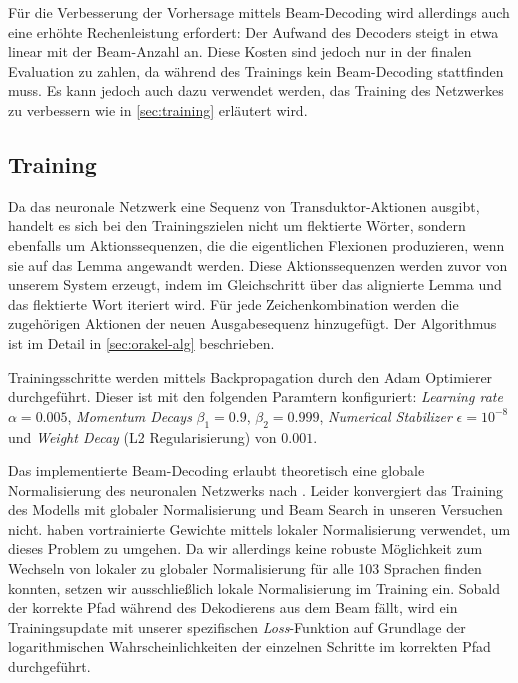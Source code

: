 \documentclass[11pt,a4paper]{article}
\begin{document}
Für die Verbesserung der Vorhersage mittels Beam-Decoding wird allerdings auch eine erhöhte Rechenleistung erfordert: Der Aufwand des Decoders steigt in etwa linear mit der Beam-Anzahl an. 
Diese Kosten sind jedoch nur in der finalen Evaluation zu zahlen, da während des Trainings kein Beam-Decoding stattfinden muss.
Es kann jedoch auch dazu verwendet werden, das Training des Netzwerkes zu verbessern wie in \autoref{sec:training} erläutert wird.

\subsection{Training}
\label{sec:training}

Da das neuronale Netzwerk eine Sequenz von Transduktor-Aktionen ausgibt, handelt es sich bei den Trainingszielen nicht um flektierte Wörter, sondern ebenfalls um Aktionssequenzen, die die eigentlichen Flexionen produzieren, wenn sie auf das Lemma angewandt werden.
Diese Aktionssequenzen werden zuvor von unserem System erzeugt, indem im Gleichschritt über das alignierte Lemma und das flektierte Wort iteriert wird.
Für jede Zeichenkombination werden die zugehörigen Aktionen der neuen Ausgabesequenz hinzugefügt.
Der Algorithmus ist im Detail in \autoref{sec:orakel-alg} beschrieben.

Trainingsschritte werden mittels Backpropagation durch den Adam Optimierer \citep{adam:KingmaB14} durchgeführt.
Dieser ist mit den folgenden Paramtern konfiguriert: \textit{Learning rate} $\alpha=0.005$, \textit{Momentum Decays} $\beta_1=0.9$, $\beta_2=0.999$, \textit{Numerical Stabilizer} $\epsilon=10^{-8}$ und \textit{Weight Decay} (L2 Regularisierung) von $0.001$.

Das implementierte Beam-Decoding erlaubt theoretisch eine globale Normalisierung des neuronalen Netzwerks nach \citet{globalnorm:AndorAWSPGPC16}.
Leider konvergiert das Training des Modells mit globaler Normalisierung und Beam Search in unseren Versuchen nicht.
\citet{globalnorm:AndorAWSPGPC16} haben vortrainierte Gewichte mittels lokaler Normalisierung verwendet, um dieses Problem zu umgehen.
Da wir allerdings keine robuste Möglichkeit zum Wechseln von lokaler zu globaler Normalisierung für alle 103 Sprachen finden konnten, setzen wir ausschließlich lokale Normalisierung im Training ein.
Sobald der korrekte Pfad während des Dekodierens aus dem Beam fällt, wird ein Trainingsupdate mit unserer spezifischen \textit{Loss}-Funktion auf Grundlage der logarithmischen Wahrscheinlichkeiten der einzelnen Schritte im korrekten Pfad durchgeführt.
\end{document}

